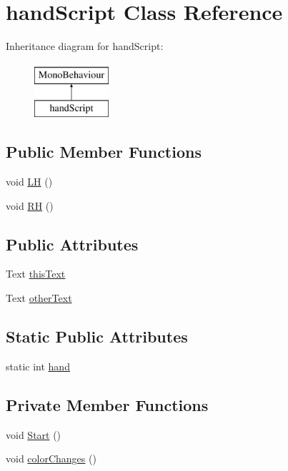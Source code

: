 \hypertarget{classhand_script}{}\section{hand\+Script Class Reference}
\label{classhand_script}
Inheritance diagram for hand\+Script\+:\begin{figure}[H]
\begin{center}
\leavevmode
\includegraphics[height=2.000000cm]{classhand_script}
\end{center}
\end{figure}
\subsection*{Public Member Functions}
\begin{DoxyCompactItemize}
\item 
void \hyperlink{classhand_script_a62e593760441c466a04fd26d536cb67a}{L\+H} ()
\item 
void \hyperlink{classhand_script_a64481676bd93e645bed1e263edade065}{R\+H} ()
\end{DoxyCompactItemize}
\subsection*{Public Attributes}
\begin{DoxyCompactItemize}
\item 
Text \hyperlink{classhand_script_a2f300212a9a7f2528c525060eb9d17e4}{this\+Text}
\item 
Text \hyperlink{classhand_script_a2e323ace258263f11a78df53dd7644bd}{other\+Text}
\end{DoxyCompactItemize}
\subsection*{Static Public Attributes}
\begin{DoxyCompactItemize}
\item 
static int \hyperlink{classhand_script_a6ead5b70e39c2831d69fdab64c1226ff}{hand}
\end{DoxyCompactItemize}
\subsection*{Private Member Functions}
\begin{DoxyCompactItemize}
\item 
void \hyperlink{classhand_script_a17986f73e63381c246a9b4b453278fc7}{Start} ()
\item 
void \hyperlink{classhand_script_ac872a547fa3bf7c1a9c800c8d9bdff67}{color\+Changes} ()
\end{DoxyCompactItemize}



